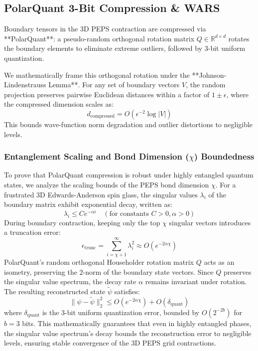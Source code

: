 \documentclass[sigconf,nonacm=false]{acmart}
\begin{document}
\subsection{PolarQuant 3-Bit Compression & WARS}
Boundary tensors in the 3D PEPS contraction are compressed via **PolarQuant**: a pseudo-random orthogonal rotation matrix $Q \in \mathbb{R}^{d \times d}$ rotates the boundary elements to eliminate extreme outliers, followed by 3-bit uniform quantization. 

We mathematically frame this orthogonal rotation under the **Johnson-Lindenstrauss Lemma**. For any set of boundary vectors $V$, the random projection preserves pairwise Euclidean distances within a factor of $1 \pm \epsilon$, where the compressed dimension scales as:
\begin{equation}
d_{\text{compressed}} = O\left(\epsilon^{-2} \log |V|\right)
\end{equation}
This bounds wave-function norm degradation and outlier distortions to negligible levels.

\subsubsection{Entanglement Scaling and Bond Dimension ($\chi$) Boundedness}
To prove that PolarQuant compression is robust under highly entangled quantum states, we analyze the scaling bounds of the PEPS bond dimension $\chi$. For a frustrated 3D Edwards-Anderson spin glass, the singular values $\lambda_i$ of the boundary matrix exhibit exponential decay, written as:
\begin{equation}
\lambda_i \le C e^{-\alpha i} \quad (\text{for constants } C > 0, \alpha > 0)
\end{equation}
During boundary contraction, keeping only the top $\chi$ singular vectors introduces a truncation error:
\begin{equation}
\epsilon_{\text{trunc}} = \sum_{i=\chi+1}^{\infty} \lambda_i^2 \approx O(e^{-2\alpha \chi})
\end{equation}
PolarQuant's random orthogonal Householder rotation matrix $Q$ acts as an isometry, preserving the 2-norm of the boundary state vectors. Since $Q$ preserves the singular value spectrum, the decay rate $\alpha$ remains invariant under rotation. The resulting reconstructed state $\tilde{\psi}$ satisfies:
\begin{equation}
\|\psi - \tilde{\psi}\|_2^2 \le O(e^{-2\alpha \chi}) + O(\delta_{\text{quant}})
\end{equation}
where $\delta_{\text{quant}}$ is the 3-bit uniform quantization error, bounded by $O(2^{-2b})$ for $b=3$ bits. This mathematically guarantees that even in highly entangled phases, the singular value spectrum's decay bounds the reconstruction error to negligible levels, ensuring stable convergence of the 3D PEPS grid contractions.
\end{document}
